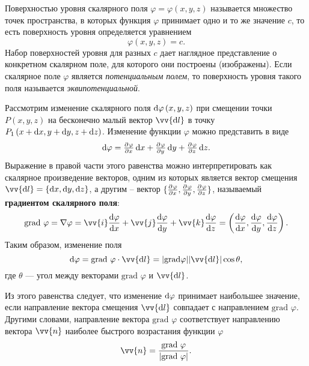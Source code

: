 \documentclass[11pt, a4paper]{article}
\theoremstyle{plain}
\theoremstyle{definition}
\theoremstyle{remark}
\renewcommand{\phi}{\ensuremath{\varphi}}
\begin{document}
Поверхностью уровня скалярного поля $\phi = \phi \left(x, y, z\right)$ называется множество точек пространства, в которых функция $\phi$ принимает одно и то же значение $c$, то есть поверхность уровня определяется уравнением 
\begin{equation*}
    \phi \left(x, y, z\right) = c.
\end{equation*}
Набор поверхностей уровня для разных $c$ дает наглядное представление о конкретном скалярном поле, для которого они построены (изображены).
Если скалярное поле $\phi$ является \textit{потенциальным полем}, то поверхность уровня такого поля называется \textit{эквипотенциальной}.

Рассмотрим изменение скалярного поля $\dif \phi\left(x, y, z\right)$ при смещении точки $P\left( x, y,z \right)$ на бесконечно малый вектор $\vv{\dif l}$ в точку $P_1\left( x + \dif x, y + \dif y, z +
\dif z \right)$.
Изменение функции $\phi$ можно представить в виде
\begin{equation*}
    \dif \phi = \pd{\phi}{x}\dif x + \pd{\phi}{y}\dif y + \pd{\phi}{z}\dif z.
\end{equation*}
Выражение в правой части этого равенства можно интерпретировать как скалярное произведение векторов, одним из которых является вектор смещения $\vv{\dif l} = \{\dif x, \dif y, \dif z\}$, а другим – вектор $\{\pd{\phi}{x}, \pd{\phi}{y}, \pd{\phi}{z}\}$, называемый \textbf{градиентом скалярного поля}: 
\begin{equation*}
    \text{grad } \phi = \nabla \phi = \vv{i} \dfrac{\dif \phi}{\dif x} + \vv{j} \dfrac{\dif \phi}{\dif y} + \vv{k} \dfrac{\dif \phi}{\dif z} = \left(\dfrac{\dif \phi}{\dif x}, \dfrac{\dif \phi}{\dif y}, \dfrac{\dif \phi}{\dif z} \right).
\end{equation*}
Таким образом, изменение поля
\begin{equation*}
    \dif \phi = \text{grad } \phi \cdot \vv{\dif l} = |\text{grad} \phi|  |\vv{\dif l}|  \cos \theta,
\end{equation*}
где $\theta$ --- угол между векторами $\text{grad } \phi$ и $\vv{\dif l}$.

Из этого равенства следует, что изменение $\dif \phi$ принимает наибольшее значение, если направление вектора смещения $\vv{\dif l}$ совпадает с направлением $\text{grad } \phi$. Другими словами, направление вектора  $\text{grad } \phi$ соответствует направлению вектора  $\vv{n}$ наиболее быстрого возрастания функции $\phi$
\begin{equation*}
    \vv{n} = \dfrac{\text{grad } \phi}{|\text{grad } \phi|}.
\end{equation*}
\end{document}
